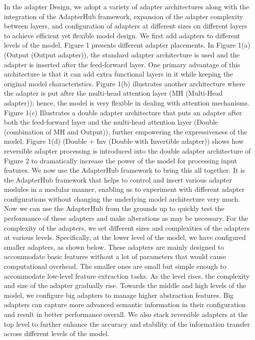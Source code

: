\documentclass[conference]{IEEEtran}
\begin{document}
In the adapter Design, we adopt a variety of adapter architectures along with the integration of the AdapterHub framework, expansion of the adapter complexity between layers, and configuration of adapters at different sizes on different layers to achieve efficient yet flexible model design. We first add adapters to different levels of the model. Figure 1 presents different adapter placements. In Figure 1(a) (Output (Output adapter))\cite{b13}, the standard adapter architecture is used and the adapter is inserted after the feed-forward layer. One primary advantage of this architecture is that it can add extra functional layers in it while keeping the original model characteristics. Figure 1(b)\cite{b13} illustrates another architecture where the adapter is put after the multi-head attention layer (MH (Multi-Head adapter)); hence, the model is very flexible in dealing with attention mechanisms. Figure 1(c) Illustrates a double adapter architecture that puts an adapter after both the feed-forward layer and the multi-head attention layer (Double (combination of MH and Output))\cite{b3}, further empowering the expressiveness of the model. Figure 1(d) (Double + Inv (Double with Invertible adapter)) \cite{b13} shows how reversible adapter processing is introduced into the double adapter architecture of Figure 2 to dramatically increase the power of the model for processing input features. We now use the AdapterHub framework to bring this all together. It is the AdapterHub framework that helps to control and insert various adapter modules in a modular manner, enabling us to experiment with different adapter configurations without changing the underlying model architecture very much. Now we can use the AdapterHub from the grounds up to quickly test the performance of these adapters and make alterations as may be necessary. For the complexity of the adapters, we set different sizes and complexities of the adapters at various levels. Specifically, at the lower level of the model, we have configured smaller adapters, as shown below. These adapters are mainly designed to accommodate basic features without a lot of parameters that would cause computational overhead. The smaller ones are small but simple enough to accommodate low-level feature extraction tasks. As the level rises, the complexity and size of the adapter gradually rise. Towards the middle and high levels of the model, we configure big adapters to manage higher abstraction features. Big adapters can capture more advanced semantic information in their configuration and result in better performance overall. We also stack reversible adapters at the top level to further enhance the accuracy and stability of the information transfer across different levels of the model.
\end{document}
